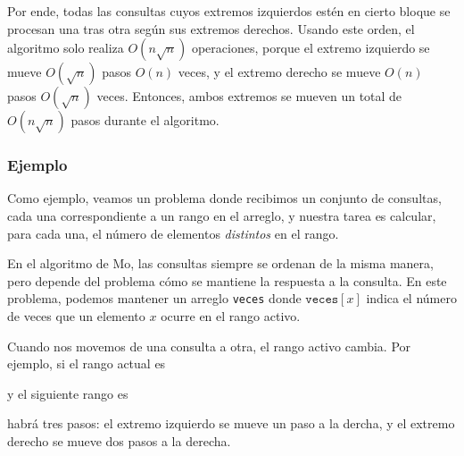 Por ende, todas las consultas cuyos extremos izquierdos estén en cierto
bloque se procesan una tras otra según sus extremos derechos. Usando este
orden, el algoritmo solo realiza $O(n \sqrt n)$ operaciones, porque el
extremo izquierdo se mueve $O(\sqrt n)$ pasos $O(n)$ veces, y el extremo
derecho se mueve $O(n)$ pasos $O(\sqrt n)$ veces. Entonces, ambos extremos
se mueven un total de $O(n \sqrt n)$ pasos durante el algoritmo.

\subsubsection*{Ejemplo}

Como ejemplo, veamos un problema donde recibimos un conjunto de consultas,
cada una correspondiente a un rango en el arreglo, y nuestra tarea es
calcular, para cada una, el número de elementos \emph{distintos} en el rango.

En el algoritmo de Mo, las consultas siempre se ordenan de la misma manera,
pero depende del problema cómo se mantiene la respuesta a la consulta.
En este problema, podemos mantener un arreglo \texttt{veces}
donde $\texttt{veces}[x]$ indica el número de veces que un elemento
$x$ ocurre en el rango activo.

Cuando nos movemos de una consulta a otra, el rango activo cambia. Por
ejemplo, si el rango actual es
\begin{center}
\end{center}
y el siguiente rango es
\begin{center}
\end{center}
habrá tres pasos: el extremo izquierdo se mueve un paso a la dercha, y el
extremo derecho se mueve dos pasos a la derecha.

